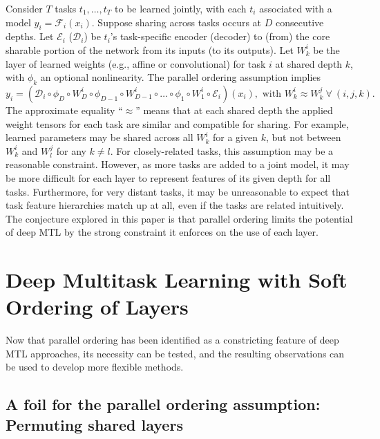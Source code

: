 \documentclass{article}
\theoremstyle{definition}
\theoremstyle{remark}
\begin{document}
Consider $T$ tasks $t_1, \ldots ,t_T$ to be learned jointly, with each $t_i$ associated with a model $y_i = \mathcal{F}_i(x_i)$.
Suppose sharing across tasks occurs at $D$ consecutive depths.
Let $\mathcal{E}_i$ ($\mathcal{D}_i$) be $t_i$'s task-specific encoder (decoder) to (from) the core sharable portion of the network from its inputs (to its outputs). Let $W^i_k$ be the layer of learned weights (e.g., affine or convolutional) for task $i$ at shared depth $k$, with $\phi_k$ an optional nonlinearity.
The parallel ordering assumption implies
\begin{equation} \label{eq:fhs}
y_i = (\mathcal{D}_i \circ \phi_D \circ W^i_D \circ \phi_{D-1} \circ W^i_{D-1} \circ \ldots \circ \phi_1 \circ W^i_1 \circ \mathcal{E}_i)(x_i), \text{ with } W^i_k \approx W^j_k \ \forall \ (i,j,k).
\end{equation}
The approximate equality ``$\approx$'' means that at each shared depth the applied weight tensors for each task are similar and compatible for sharing. 
For example, learned parameters may be shared across all $W^i_k$ for a given $k$, but not between $W^i_k$ and $W^j_l$ for any $k \neq l$.
For closely-related tasks, this assumption may be a reasonable constraint. 
However, as more tasks are added to a joint model, it may be more difficult for each layer to represent features of its given depth for all tasks. Furthermore, for very distant tasks, it may be unreasonable to expect that task feature hierarchies match up at all, even if the tasks are related intuitively.
The conjecture explored in this paper is that parallel ordering limits the potential of deep MTL by the strong constraint it enforces on the use of each layer.

\section{Deep Multitask Learning with Soft Ordering of Layers} \label{sec:methods}

Now that parallel ordering has been identified as a constricting feature of deep MTL approaches, its necessity can be tested, and the resulting observations can be used to develop more flexible methods.

\subsection{A foil for the parallel ordering assumption: Permuting shared layers}
\end{document}
